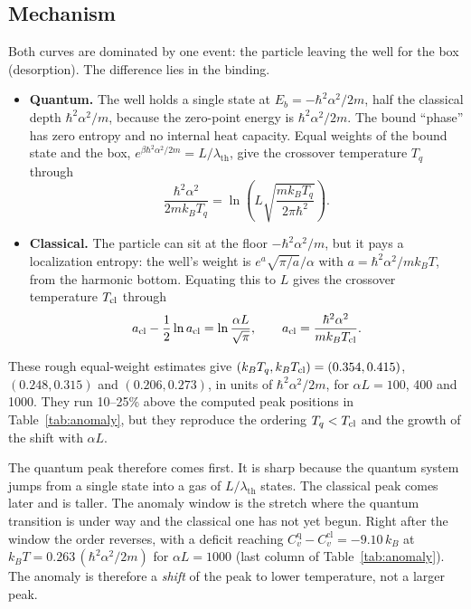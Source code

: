 \documentclass[11pt]{article}
\numberwithin{equation}{section}
\newcommand{\lth}{\lambda_{\mathrm{th}}}
\newcommand{\Cq}{C_v^{\mathrm{q}}}
\newcommand{\Ccl}{C_v^{\mathrm{cl}}}
\newcommand{\kB}{k_{B}}
\begin{document}
\subsection{Mechanism}
Both curves are dominated by one event: the particle leaving the well for the box (desorption). The difference lies in the binding.
\begin{itemize}[itemsep=2pt]
\item \textbf{Quantum.} The well holds a single state at $E_b=-\hbar^2\alpha^2/2m$, half the classical depth $\hbar^2\alpha^2/m$, because the zero-point energy is $\hbar^2\alpha^2/2m$. The bound ``phase'' has zero entropy and no internal heat capacity. Equal weights of the bound state and the box, $e^{\beta\hbar^2\alpha^2/2m}=L/\lth$, give the crossover temperature $T_q$ through
\begin{equation}
\frac{\hbar^2\alpha^2}{2m\kB T_q}=\ln\!\left(L\sqrt{\frac{m\kB T_q}{2\pi\hbar^2}}\right).
\end{equation}
\item \textbf{Classical.} The particle can sit at the floor $-\hbar^2\alpha^2/m$, but it pays a localization entropy: the well's weight is $e^{a}\sqrt{\pi/a}/\alpha$ with $a=\hbar^2\alpha^2/m\kB T$, from the harmonic bottom. Equating this to $L$ gives the crossover temperature $T_{\rm cl}$ through
\begin{equation}
a_{\rm cl}-\frac12\ln a_{\rm cl}=\ln\frac{\alpha L}{\sqrt\pi},\qquad a_{\rm cl}=\frac{\hbar^2\alpha^2}{m\kB T_{\rm cl}}.
\end{equation}
\end{itemize}
These rough equal-weight estimates give $(\kB T_q,\kB T_{\rm cl})=(0.354,0.415)$, $(0.248,0.315)$ and $(0.206,0.273)$, in units of $\hbar^2\alpha^2/2m$, for $\alpha L=100$, 400 and 1000. They run 10--25\% above the computed peak positions in Table~\ref{tab:anomaly}, but they reproduce the ordering $T_q<T_{\rm cl}$ and the growth of the shift with $\alpha L$.

The quantum peak therefore comes first. It is sharp because the quantum system jumps from a single state into a gas of $L/\lth$ states. The classical peak comes later and is taller. The anomaly window is the stretch where the quantum transition is under way and the classical one has not yet begun. Right after the window the order reverses, with a deficit reaching $\Cq-\Ccl=-9.10\,\kB$ at $\kB T=0.263\,(\hbar^2\alpha^2/2m)$ for $\alpha L=1000$ (last column of Table~\ref{tab:anomaly}). The anomaly is therefore a \emph{shift} of the peak to lower temperature, not a larger peak.
\end{document}
